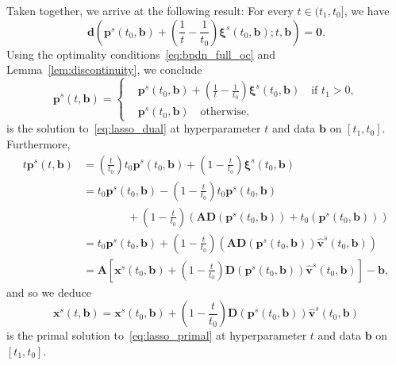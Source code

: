 \documentclass[11pt]{article}
\numberwithin{prop}{section}
\numberwithin{lem}{section}
\numberwithin{rem}{section}
\numberwithin{cor}{section}
\numberwithin{thm}{section}
\numberwithin{defn}{section}
\numberwithin{fact}{section}
\theoremstyle{plain}
\def\bb {\boldsymbol{b}}
\def\bd {\boldsymbol{d}}
\def\tzero {t_{0}}
\def\bp {\boldsymbol{p}}
\def\bv {\boldsymbol{v}}
\def\bx {\boldsymbol{x}}
\def\bxi {\boldsymbol{\xi}}
\newcommand{\matr}[1]{\bm{#1}}
\begin{document}
Taken together, we arrive at the following result: For every $t \in (t_{1},\tzero]$, we have
\[
\bd\left(\bp^{s}(\tzero,\bb) + \left(\frac{1}{t}-\frac{1}{\tzero}\right)\bxi^{s}(\tzero,\bb); t, \bb \right) = \boldsymbol{0}.
\]
Using the optimality conditions~\eqref{eq:bpdn_full_oc} and Lemma~\ref{lem:discontinuity}, we conclude
\[
\bp^{s}(t,\bb) = \begin{cases}
 		&\bp^{s}(\tzero,\bb) + \left(\frac{1}{t} - \frac{1}{\tzero}\right)\bxi^{s}(\tzero,\bb) \quad \text{if $t_{1} > 0$}, \\
 		&\bp^{s}(\tzero,\bb) \quad \text{otherwise,}
 		\end{cases}
\]
is the solution to~\eqref{eq:lasso_dual} at hyperparameter $t$ and data $\bb$ on $[t_{1},\tzero]$. Furthermore,
\[
\begin{alignedat}{1}
	t\bp^{s}(t,\bb) &= \left(\frac{t}{\tzero}\right)\tzero\bp^{s}(\tzero,\bb) + \left(1-\frac{t}{\tzero}\right)\bxi^{s}(\tzero,\bb)\\
	&= \tzero\bp^{s}(\tzero,\bb) - \left(1 - \frac{t}{\tzero}\right)\tzero\bp^{s}(\tzero,\bb) \\
	&\qquad\qquad + \left(1 - \frac{t}{\tzero}\right)(\matr{A}\matr{D}(\bp^{s}(\tzero,\bb)) + \tzero(\bp^{s}(\tzero,\bb)))\\
	&= \tzero\bp^{s}(\tzero,\bb) + \left(1-\frac{t}{\tzero}\right)\left(\matr{A}\matr{D}(\bp^{s}(\tzero,\bb))\hat{\bv}^{s}(\tzero,\bb) \right) \\
	&= \matr{A}\left[\bx^{s}(\tzero,\bb) + \left(1 - \frac{t}{\tzero}\right)\matr{D}(\bp^{s}(\tzero,\bb))\hat{\bv}^{s}(\tzero,\bb)\right] - \bb,
\end{alignedat}
\]
and so we deduce
\[
\bx^{s}(t,\bb) = \bx^{s}(\tzero,\bb) + \left(1-\frac{t}{\tzero}\right)\matr{D}(\bp^{s}(\tzero,\bb))\hat{\bv}^{s}(\tzero,\bb)
\]
is the primal solution to~\eqref{eq:lasso_primal} at hyperparameter $t$ and data $\bb$ on $[t_{1},\tzero]$.



\end{document}
